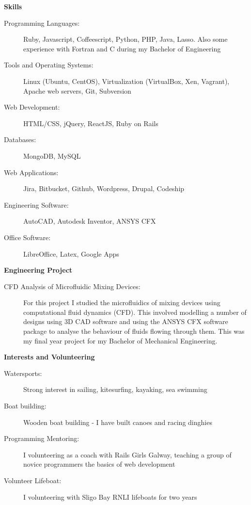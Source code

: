 \documentclass[letterpaper,11pt]{article}
\newcommand{\resheading}[1]{{\large \colorbox{mygrey}{\begin{minipage}{\textwidth}{\textbf{#1 \vphantom{p\^{E}}}}\end{minipage}}}}
\begin{document}
\resheading{Skills}
	\begin{description}
		\item[Programming Languages:] { \footnotesize Ruby, Javascript, Coffeescript, Python, PHP, Java, Lasso. 
		Also some experience with Fortran and C during my Bachelor of Engineering}
		\item[Tools and Operating Systems:] { \footnotesize Linux (Ubuntu, CentOS), Virtualization (VirtualBox, Xen, Vagrant), Apache web servers, Git, Subversion
		}
		\item[Web Development:] {\footnotesize HTML/CSS, jQuery, ReactJS, Ruby on Rails }
		\item[Databases:] {\footnotesize MongoDB, MySQL}
		\item[Web Applications:] {\footnotesize Jira, Bitbucket, Github, Wordpress, Drupal, Codeship}
		\item[Engineering Software:]{\footnotesize AutoCAD, Autodesk Inventor, ANSYS CFX}
		\item[Office Software:]{\footnotesize LibreOffice, Latex, Google Apps} 

	\end{description} %

\resheading{Engineering Project}

\begin{description}
\item[CFD Analysis of Microfluidic Mixing Devices:] { \footnotesize For this project I studied the microfluidics of mixing devices using computational fluid dynamics (CFD). This involved modelling a number of designs using 3D CAD software and using the ANSYS CFX software package to analyse the behaviour of fluids flowing through them. This was my final year project for my Bachelor of Mechanical Engineering. }
\end{description}

\resheading{Interests and Volunteering}
	\begin{description}
		\item[Watersports:] { \footnotesize Strong interest in sailing, kitesurfing, kayaking, sea swimming}
		\item[Boat building:] { \footnotesize Wooden boat building - I have built canoes and racing dinghies
		}
		\item[Programming Mentoring:] { \footnotesize I volunteering as a coach with Rails Girls Galway, teaching a group of novice programmers the basics of web development}
		\item[Volunteer Lifeboat:] { \footnotesize I volunteering with Sligo Bay RNLI lifeboats for two years} 

	\end{description} %
\end{document}
